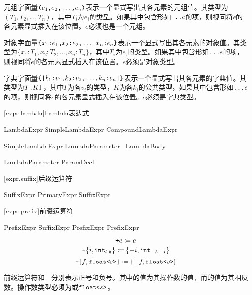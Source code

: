 \pnum
元组字面量$\texttt{(}e_1\texttt{,} e_2\texttt{,} \ldots\texttt{,} e_n\texttt{)}$表示一个显式写出其各元素的元组值。其类型为$(T_1, T_2, \ldots, T_n)$，其中$T_i$为$e_i$的类型。如果其中包含形如$\texttt{...}e$的项，则视同将$e$的各元素显式插入在该位置。$e$必须也是一个元组。

\pnum
对象字面量$\texttt{\{}x_1\texttt{:} e_1\texttt{,} x_2\texttt{:} e_2\texttt{,} \ldots\texttt{,} x_n\texttt{:} e_n\texttt{\}}$表示一个显式写出其各元素的对象值。其类型为$\{x_1: T_1, x_2: T_2, \ldots, x_n: T_n\}$，其中$T_i$为$e_i$的类型。如果其中包含形如$\texttt{...}e$的项，则视同将$e$的各元素显式插入在该位置。$e$必须是对象类型。

\pnum
字典字面量$\texttt{\{|}k_1\texttt{:} v_1\texttt{,} k_2\texttt{:} v_2\texttt{,} \ldots\texttt{,} k_n\texttt{:} v_n\texttt{|\}}$表示一个显式写出其各元素的字典值。其类型为$T\texttt{[}K\texttt{]}$，其中$T$为各$v_i$的类型，$K$为各$k_i$的公共类型。如果其中包含形如$\texttt{...}e$的项，则视同将$e$的各元素显式插入在该位置。$e$必须是字典类型。

[expr.lambda]{Lambda表达式}

\begin{bnf}{LambdaExpr}
    SimpleLambdaExpr \br
    CompoundLambdaExpr
\end{bnf}

\begin{bnf}{SimpleLambdaExpr}
    LambdaParameter\bnfq\ \terminal{=>} LambdaBody
\end{bnf}

\begin{bnf}{LambdaParameter}
    ParamDecl
\end{bnf}

[expr.suffix]{后缀运算符}

\begin{bnf}{SuffixExpr}
    PrimaryExpr \br
    SuffixExpr
\end{bnf}

[expr.prefix]{前缀运算符}

\begin{bnf}{PrefixExpr}
    SuffixExpr \br
    \terminal{+} PrefixExpr \br
    \terminal{-} PrefixExpr
\end{bnf}

$$ \texttt{+} e \coloneqq e $$
$$ \texttt{-} \lbrace i, \texttt{int}_{l,h} \rbrace \coloneqq \lbrace -i, \texttt{int}_{-h,-l} \rbrace $$
$$ \texttt{-} \lbrace f, \texttt{float<}s\texttt{>} \rbrace \coloneqq \lbrace -f, \texttt{float<}s\texttt{>}\rbrace $$

\pnum
前缀运算符\tcode{+}和\ \tcode{-}\ 分别表示正号和负号。其中\tcode{+}的值为其操作数的值，而\tcode{-}的值为其相反数。操作数类型必须为或$\texttt{float<}s\texttt{>}$。

